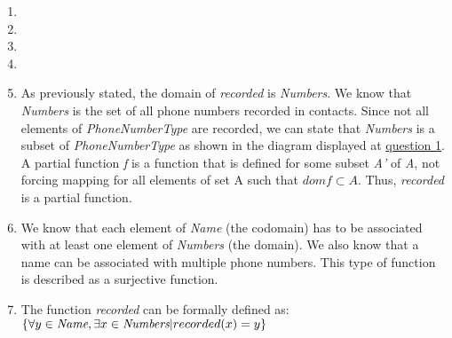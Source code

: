\begin{enumerate}
    \item
    \item
    \item
    \item
    \item As previously stated, the domain of \emph{recorded} is \emph{Numbers}. We know that \emph{Numbers} is the set 
    of all phone numbers recorded in contacts. Since not all elements of \emph{PhoneNumberType} are recorded, we can
    state that \emph{Numbers} is a subset of \emph{PhoneNumberType} as shown in the diagram displayed at \underline{question 1}.
    A partial function \emph{f} is a function that is defined for some subset \emph{A'} of \emph{A}, not forcing mapping for 
    all elements of set A such that $dom f \subset A$. Thus, \emph{recorded} is a partial function.
    \item We know that each element of \emph{Name} (the codomain) has to be associated with at least one element of 
    \emph{Numbers} (the domain). We also know that a name can be associated with multiple phone numbers. This type of 
    function is described as a surjective function. 
    \item The function \emph{recorded} can be formally defined as:\\
    $\{ \forall y \in \emph{Name},   \exists x \in \emph{Numbers} | recorded(x) = y \}$
\end{enumerate}
